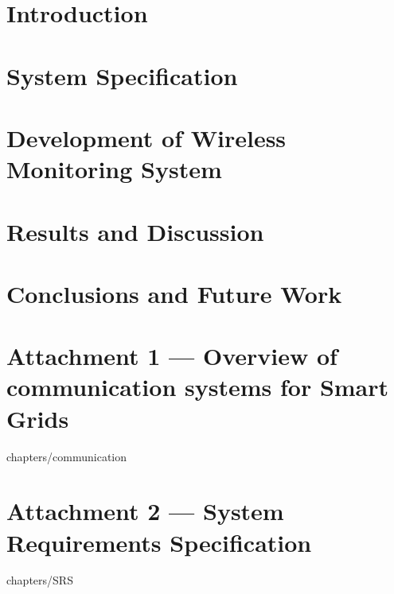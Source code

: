 \documentclass[10pt,a4paper,twoside]{report}
\begin{document}




\begin{Prolog}
\cleardoublepage

\tableofcontents



%

	
\end{Prolog}

\StartBody

\chapter{Introduction}



\chapter{System Specification}


\chapter{Development of Wireless Monitoring System}


\chapter{Results and Discussion}


\chapter{Conclusions and Future Work}







%


%
%

\chapter*{Attachment 1 --- \large{Overview of communication systems for Smart Grids}}
  {chapters/communication}
\chapter*{Attachment 2 --- \large{System Requirements Specification}}
  {chapters/SRS}
\end{document}
